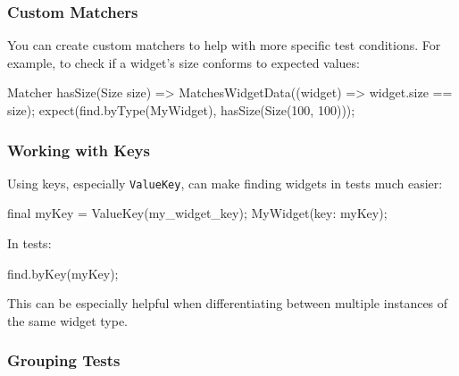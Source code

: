 \documentclass[
]{article}
\newenvironment{Shaded}{\begin{snugshade}}{\end{snugshade}}
\newcommand{\AttributeTok}[1]{\textcolor[rgb]{0.16,0.50,0.73}{#1}}
\newcommand{\DecValTok}[1]{\textcolor[rgb]{0.96,0.45,0.00}{#1}}
\newcommand{\NormalTok}[1]{\textcolor[rgb]{0.81,0.81,0.76}{#1}}
\newcommand{\OperatorTok}[1]{\textcolor[rgb]{0.81,0.81,0.76}{#1}}
\newcommand{\StringTok}[1]{\textcolor[rgb]{0.96,0.31,0.31}{#1}}
\begin{document}
\subsubsection{Custom Matchers}\label{custom-matchers}

You can create custom matchers to help with more specific test
conditions. For example, to check if a widget's size conforms to
expected values:

\begin{Shaded}
\begin{Highlighting}[]
\NormalTok{Matcher hasSize(Size size) }\OperatorTok{=\textgreater{}}\NormalTok{ MatchesWidgetData((widget) }\OperatorTok{=\textgreater{}}\NormalTok{ widget}\OperatorTok{.}\NormalTok{size }\OperatorTok{==}\NormalTok{ size);}
\NormalTok{expect(find}\OperatorTok{.}\NormalTok{byType(MyWidget)}\OperatorTok{,}\NormalTok{ hasSize(Size(}\DecValTok{100}\OperatorTok{,} \DecValTok{100}\NormalTok{)));}
\end{Highlighting}
\end{Shaded}

\subsubsection{Working with Keys}\label{working-with-keys}

Using keys, especially \texttt{ValueKey}, can make finding widgets in
tests much easier:

\begin{Shaded}
\begin{Highlighting}[]
\AttributeTok{final}\NormalTok{ myKey }\OperatorTok{=}\NormalTok{ ValueKey(}\StringTok{\textquotesingle{}my\_widget\_key\textquotesingle{}}\NormalTok{);}
\NormalTok{MyWidget(key}\OperatorTok{:}\NormalTok{ myKey);}
\end{Highlighting}
\end{Shaded}

In tests:

\begin{Shaded}
\begin{Highlighting}[]
\NormalTok{find}\OperatorTok{.}\NormalTok{byKey(myKey);}
\end{Highlighting}
\end{Shaded}

This can be especially helpful when differentiating between multiple
instances of the same widget type.

\subsubsection{Grouping Tests}\label{grouping-tests-1}
\end{document}
